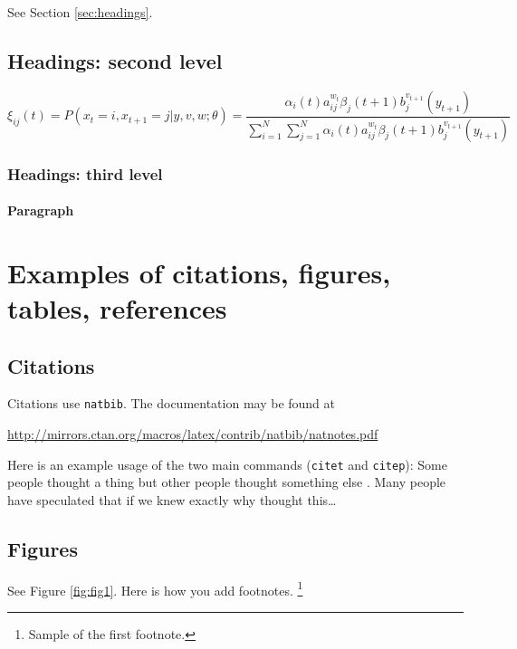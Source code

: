 \documentclass{article}
\begin{document}
\lipsum[4] See Section \ref{sec:headings}.

\subsection{Headings: second level}
\lipsum[5]
\begin{equation}
	\xi _{ij}(t)=P(x_{t}=i,x_{t+1}=j|y,v,w;\theta)= {\frac {\alpha _{i}(t)a^{w_t}_{ij}\beta _{j}(t+1)b^{v_{t+1}}_{j}(y_{t+1})}{\sum _{i=1}^{N} \sum _{j=1}^{N} \alpha _{i}(t)a^{w_t}_{ij}\beta _{j}(t+1)b^{v_{t+1}}_{j}(y_{t+1})}}
\end{equation}

\subsubsection{Headings: third level}
\lipsum[6]

\paragraph{Paragraph}
\lipsum[7]



\section{Examples of citations, figures, tables, references}
\label{sec:others}

\subsection{Citations}
Citations use \verb+natbib+. The documentation may be found at
\begin{center}
	\url{http://mirrors.ctan.org/macros/latex/contrib/natbib/natnotes.pdf}
\end{center}

Here is an example usage of the two main commands (\verb+citet+ and \verb+citep+): Some people thought a thing \citep{kour2014real, hadash2018estimate} but other people thought something else \citep{kour2014fast}. Many people have speculated that if we knew exactly why \citet{kour2014fast} thought this\dots

\subsection{Figures}
\lipsum[10]
See Figure \ref{fig:fig1}. Here is how you add footnotes. \footnote{Sample of the first footnote.}
\lipsum[11]
\end{document}
